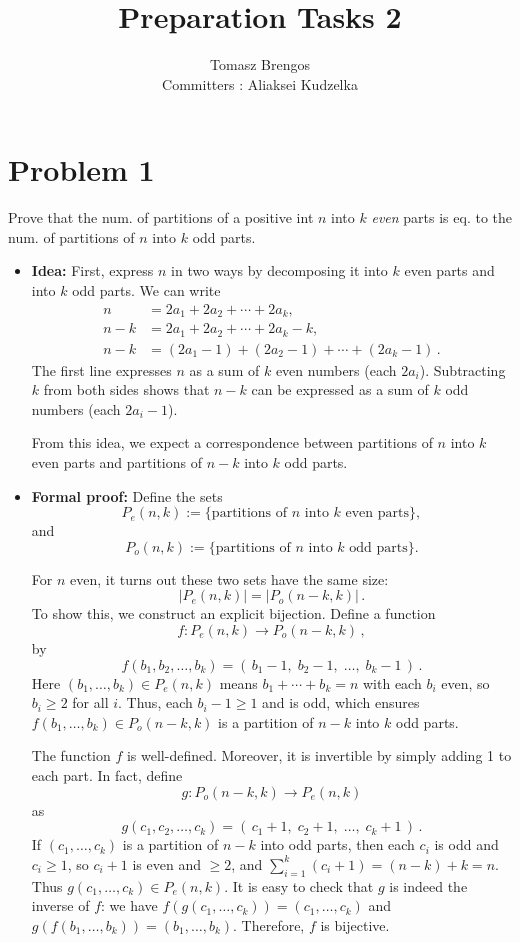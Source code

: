 \documentclass[docmute]{article}
\title{Preparation Tasks 2}
\author{Tomasz Brengos \\  
Committers : Aliaksei Kudzelka}
\date{}
\begin{document}
\maketitle

\section{Problem 1} Prove that the num. of partitions of a positive int $n$ into $k$ \textit{even} parts 
is eq. to the num. of partitions of $n$ into $k$ odd parts.

\begin{itemize}
  \item \textbf{Idea:} First, express $n$ in two ways by decomposing it into $k$ even parts and into $k$ odd parts. We can write 
  \begin{align*}
    n &= 2a_1 + 2a_2 + \cdots + 2a_k,\\
    n - k &= 2a_1 + 2a_2 + \cdots + 2a_k - k,\\
    n - k &= (2a_1 - 1) + (2a_2 - 1) + \cdots + (2a_k - 1)\,.
  \end{align*}
  The first line expresses $n$ as a sum of $k$ even numbers (each $2a_i$). Subtracting $k$ from both sides shows that $n-k$ can be expressed as a sum of $k$ odd numbers (each $2a_i - 1$). 
  
  From this idea, we expect a correspondence between partitions of $n$ into $k$ even parts and partitions of $n-k$ into $k$ odd parts.
  
  \item \textbf{Formal proof:} Define the sets 
  \[
    P_e(n,k) := \{\text{partitions of $n$ into $k$ even parts}\}, 
  \] 
  and 
  \[
    P_o(n,k) := \{\text{partitions of $n$ into $k$ odd parts}\}. 
  \] 

  
  For $n$ even, it turns out these two sets have the same size: 
  \[
    |P_e(n,k)| = |P_o(n-k,k)|\,.
  \] 
  To show this, we construct an explicit bijection. Define a function 
  \[
    f: P_e(n,k) \to P_o(n-k,k)\,,
  \] 
  by 
  \[
    f(b_1,b_2,\ldots,b_k) = (\,b_1 - 1,\; b_2 - 1,\; \ldots,\; b_k - 1\,)\,. 
  \] 
  Here $(b_1,\ldots,b_k) \in P_e(n,k)$ means $b_1 + \cdots + b_k = n$ with each $b_i$ even, so $b_i \ge 2$ for all $i$. Thus, each $b_i - 1 \ge 1$ and is odd, which ensures $f(b_1,\ldots,b_k) \in P_o(n-k,k)$ is a partition of $n-k$ into $k$ odd parts.

  The function $f$ is well-defined. Moreover, it is invertible by simply adding 1 to each part. In fact, define 
  \[
    g: P_o(n-k,k) \to P_e(n,k)
  \] 
  as 
  \[
    g(c_1,c_2,\ldots,c_k) = (\,c_1 + 1,\; c_2 + 1,\; \ldots,\; c_k + 1\,)\,. 
  \] 
  If $(c_1,\ldots,c_k)$ is a partition of $n-k$ into odd parts, then each $c_i$ is odd and $c_i \ge 1$, so $c_i + 1$ is even and $\ge 2$, and $\sum_{i=1}^k (c_i + 1) = (n-k) + k = n$. Thus $g(c_1,\ldots,c_k) \in P_e(n,k)$. It is easy to check that $g$ is indeed the inverse of $f$: we have $f(g(c_1,\ldots,c_k)) = (c_1,\ldots,c_k)$ and $g(f(b_1,\ldots,b_k)) = (b_1,\ldots,b_k)$. Therefore, $f$ is bijective.
\end{itemize}
\end{document}
